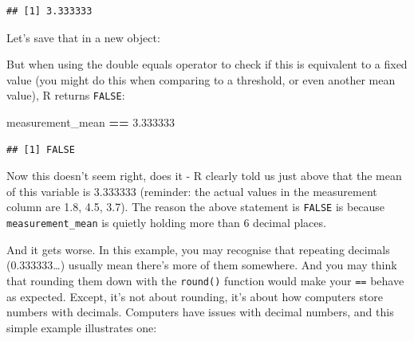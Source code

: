 \documentclass[
  12pt,
  krantz2]{krantz}
\makeatletter
\newenvironment{Shaded}{\begin{snugshade}}{\end{snugshade}}
\newcommand{\FloatTok}[1]{\textcolor[rgb]{0.00,0.00,0.81}{#1}}
\newcommand{\KeywordTok}[1]{\textcolor[rgb]{0.13,0.29,0.53}{\textbf{#1}}}
\newcommand{\NormalTok}[1]{#1}
\newcommand{\OperatorTok}[1]{\textcolor[rgb]{0.81,0.36,0.00}{\textbf{#1}}}
\newcommand{\StringTok}[1]{\textcolor[rgb]{0.31,0.60,0.02}{#1}}
\newenvironment{kframe}{%
\medskip{}
\setlength{\fboxsep}{.8em}
 \def\at@end@of@kframe{}%
 \ifinner\ifhmode%
  \def\at@end@of@kframe{\end{minipage}}%
  \begin{minipage}{\columnwidth}%
 \fi\fi%
 \def\FrameCommand##1{\hskip\@totalleftmargin \hskip-\fboxsep
 \colorbox{shadecolor}{##1}\hskip-\fboxsep
     \hskip-\linewidth \hskip-\@totalleftmargin \hskip\columnwidth}%
 \MakeFramed {\advance\hsize-\width
   \@totalleftmargin\z@ \linewidth\hsize
   \@setminipage}}%
 {\par\unskip\endMakeFramed%
 \at@end@of@kframe}
\renewenvironment{Shaded}{\begin{kframe}}{\end{kframe}}
\makeatother
\begin{document}
\begin{Shaded}
\end{Shaded}

\begin{verbatim}
## [1] 3.333333
\end{verbatim}

Let's save that in a new object:

\begin{Shaded}
\end{Shaded}

But when using the double equals operator to check if this is equivalent to a fixed value (you might do this when comparing to a threshold, or even another mean value), R returns \texttt{FALSE}:

\begin{Shaded}
\begin{Highlighting}[]
\NormalTok{measurement_mean }\OperatorTok{==}\StringTok{ }\FloatTok{3.333333}
\end{Highlighting}
\end{Shaded}

\begin{verbatim}
## [1] FALSE
\end{verbatim}

Now this doesn't seem right, does it - R clearly told us just above that the mean of this variable is 3.333333 (reminder: the actual values in the measurement column are 1.8, 4.5, 3.7).
The reason the above statement is \texttt{FALSE} is because \texttt{measurement\_mean} is quietly holding more than 6 decimal places.

And it gets worse. In this example, you may recognise that repeating decimals (0.333333\ldots) usually mean there's more of them somewhere. And you may think that rounding them down with the \texttt{round()} function would make your \texttt{==} behave as expected. Except, it's not about rounding, it's about how computers store numbers with decimals. Computers have issues with decimal numbers, and this simple example illustrates one:
\end{document}
